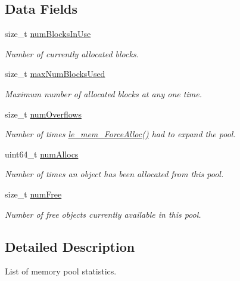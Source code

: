 \subsection*{Data Fields}
\begin{DoxyCompactItemize}
\item 
size\+\_\+t \hyperlink{structle__mem___pool_stats__t_a313be0351549e89c5137819f67b72e3b}{num\+Blocks\+In\+Use}
\begin{DoxyCompactList}\small\item\em Number of currently allocated blocks. \end{DoxyCompactList}\item 
size\+\_\+t \hyperlink{structle__mem___pool_stats__t_ae0ecac2638936865038492db1e7d3d20}{max\+Num\+Blocks\+Used}
\begin{DoxyCompactList}\small\item\em Maximum number of allocated blocks at any one time. \end{DoxyCompactList}\item 
size\+\_\+t \hyperlink{structle__mem___pool_stats__t_ae60202bce92af5ecb9b0f4a2312be7ec}{num\+Overflows}
\begin{DoxyCompactList}\small\item\em Number of times \hyperlink{le__mem_8h_af7c289c73d4182835a26a9099f3db359}{le\+\_\+mem\+\_\+\+Force\+Alloc()} had to expand the pool. \end{DoxyCompactList}\item 
uint64\+\_\+t \hyperlink{structle__mem___pool_stats__t_abcfdbe19fa0d2deb6bc57858fc0c4512}{num\+Allocs}
\begin{DoxyCompactList}\small\item\em Number of times an object has been allocated from this pool. \end{DoxyCompactList}\item 
size\+\_\+t \hyperlink{structle__mem___pool_stats__t_adbc69b9f0b2b6719fdb9f40e29688381}{num\+Free}
\begin{DoxyCompactList}\small\item\em Number of free objects currently available in this pool. \end{DoxyCompactList}\end{DoxyCompactItemize}


\subsection{Detailed Description}
List of memory pool statistics. 

